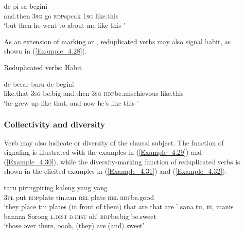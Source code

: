 \ea
\label{Example_4.27}
 {de} {pi} {} {sa} {begini}\\ %
 and.then  \textsc{3sg}  go  \textsc{rdp}{\Tilde}speak  \textsc{1sg}  like.this\\
\glt 
‘but then he went to  about me like this ’ \textstyleExampleSource{[081025-009b-Cv.0006]}
\z


As an extension of marking  or , reduplicated verbs may also signal habit, as shown in (\ref{Example_4.28}).


\begin{styleExampleTitle}
Reduplicated verbs: Habit
\end{styleExampleTitle}

\ea
\label{Example_4.28}
 {de} {besar} {baru} {de} {} {begini}\\ %
 like.that  \textsc{3sg}  be.big  and.then  \textsc{3sg}  \textsc{rdp}{\Tilde}be.mischievous  like.this\\

\glt
‘he grew up like that, and now he’s  like this ’ \textstyleExampleSource{[080917-010-CvEx.0044]}
\z

\subsubsection[Collectivity and diversity]{Collectivity and diversity}
\label{Para_4.2.2.2}
Verb  may also indicate  or diversity of the clausal subject. The function of signaling  is illustrated with the examples in (\ref{Example_4.29}) and (\ref{Example_4.30}), while the diversity-marking function of reduplicated verbs is shown in the elicited examples in (\ref{Example_4.31}) and (\ref{Example_4.32}).


\ea
\label{Example_4.29}
 {taru} {piring{\Tilde}piring} {kaleng} {yang} {} {yang} {}\\ %
 \textsc{3pl}  put  \textsc{rdp}{\Tilde}plate  tin.can  \textsc{rel}  plate  \textsc{rel}  \textsc{rdp}{\Tilde}be.good\\

 ‘they place tin plates (in front of them) that are  that are ’ \textstyleExampleSource{[081014-010-CvEx.0015]}
\z
\ea
\label{Example_4.30}
 {} {sana} {tu}, {iii}, {} {manis}\\ %
 banana  Sorong  \textsc{l.dist}  \textsc{d.dist}  oh!  \textsc{rdp}{\Tilde}be.big  be.sweet\\
\glt 
‘those  over there, oooh, (they) are  (and) sweet’ \textstyleExampleSource{[081011-003-Cv.0017]}
\z

